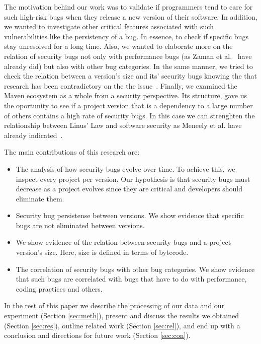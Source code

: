 \documentclass[conference]{IEEEtran}
\begin{document}
The motivation behind our work was to validate if programmers tend to care for
such high-risk bugs when they release a new version of their software. In
addition, we wanted to investigate other critical features associated with such
vulnerabilities like the persistency of a bug. In essence, to check if specific bugs stay
unresolved for a long time. Also, we wanted to elaborate more on the relation of security
bugs not only with performance bugs (as Zaman et al.~\cite{ZAH11} have already
did) but also with other bug categories. In the same manner, we tried to check
the relation between a version's size and its' security bugs knowing the
that research has been contradictory on the the issue~\cite{BP84, SYTP85,
NBZ06, GKMS00}. Finally, we examined the Maven ecosystem as a whole from a security
perspective. Its structure, gave us the oportunity to see if a project version that is a dependency to
a large number of others contains a high rate of security bugs.
In this case we can strenghten the relationship between Linus' Law and
software security as Meneely et al. have already indicated~\cite{MW10}.

The main contributions of this research are:

\begin{itemize}
	\item The analysis of how security bugs evolve over time. To achieve
this, we inspect every project per version. Our hypothesis is that security
bugs must decrease as a project evolves since they are critical and developers
should eliminate them.
	\item Security bug persistense between versions. We show evidence that
specific bugs are not eliminated between versions.
	\item We show evidence of the relation between security bugs and a project
version's size.  Here, size is defined in terms of bytecode.
	\item The correlation of security bugs with other bug categories. We
show evidence that such bugs are correlated with bugs that have to do with
performance, coding practices and others.
\end{itemize}

In the rest of this paper we
describe the processing of our data and our experiment (Section \ref{sec:meth}),
present and discuss the results we obtained (Section \ref{sec:res}),
outline related work (Section \ref{sec:rel}),
and end up with a conclusion and directions for future work (Section \ref{sec:con}).
\end{document}
